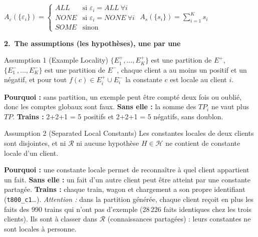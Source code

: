 \documentclass[10pt]{article}
\newcommand{\titrebox}[2]{\needspace{10\baselineskip}\vspace{8pt}
  \begin{tcolorbox}[colback=marine, colframe=marine, arc=0pt, boxrule=0pt,
    top=4pt, bottom=4pt, left=8pt]
  \color{white}\Large\bfseries #1.~#2
  \end{tcolorbox}\vspace{2pt}}
\newcommand{\st}[1]{\par\needspace{7\baselineskip}\vspace{5pt}{\normalsize\bfseries\textcolor{marine}{#1}}\par\vspace{2pt}}
\begin{document}
\st{Aggregation functions}
\begin{center}
$A_\varepsilon(\{\varepsilon_i\})=\begin{cases}\mathit{ALL}&\text{si }\varepsilon_i=\mathit{ALL}\ \forall i\\ \mathit{NONE}&\text{si }\varepsilon_i=\mathit{NONE}\ \forall i\\ \mathit{SOME}&\text{sinon}\end{cases}$
\qquad $A_s(\{s_i\})=\sum_{i=1}^{K}s_i$
\end{center}

\titrebox{2}{The assumptions (les hypothèses), une par une}

\st{Assumption 1 --- Example Locality}
\begin{enonce}{Assumption 1 (Example Locality)}
$\{E_1^+,\dots,E_K^+\}$ est une partition de $E^+$, $\{E_1^-,\dots,E_K^-\}$ est une partition de $E^-$,
chaque client a au moins un positif et un négatif, et pour tout $f(c)\in E_i^+\cup E_i^-$ la constante $c$ est locale au client $i$.
\end{enonce}
\textbf{Pourquoi :} sans partition, un exemple peut être compté deux fois ou oublié, donc les comptes globaux sont faux.
\textbf{Sans elle :} la somme des $TP_i$ ne vaut plus $TP$.
\textbf{Trains :} 2+2+1 = 5 positifs et 2+2+1 = 5 négatifs, sans doublon.

\st{Assumption 2 --- Separated Local Constants}
\begin{enonce}{Assumption 2 (Separated Local Constants)}
Les constantes locales de deux clients sont disjointes, et ni $\mathcal{R}$ ni aucune hypothèse $H\in\mathcal{H}$ ne contient de constante locale d'un client.
\end{enonce}
\textbf{Pourquoi :} une constante locale permet de reconnaître à quel client appartient un fait. \textbf{Sans elle :} un fait d'un autre client peut être atteint par une constante partagée.
\textbf{Trains :} chaque train, wagon et chargement a son propre identifiant (\texttt{t800\_c1}\ldots). \emph{Attention :} dans la partition générée, chaque client reçoit en plus les faits des 990 trains qui n'ont pas d'exemple (28\,226 faits identiques chez les trois clients). Ils sont à classer dans $\mathcal{R}$ (connaissances partagées) : leurs constantes ne sont locales à personne.
\end{document}
